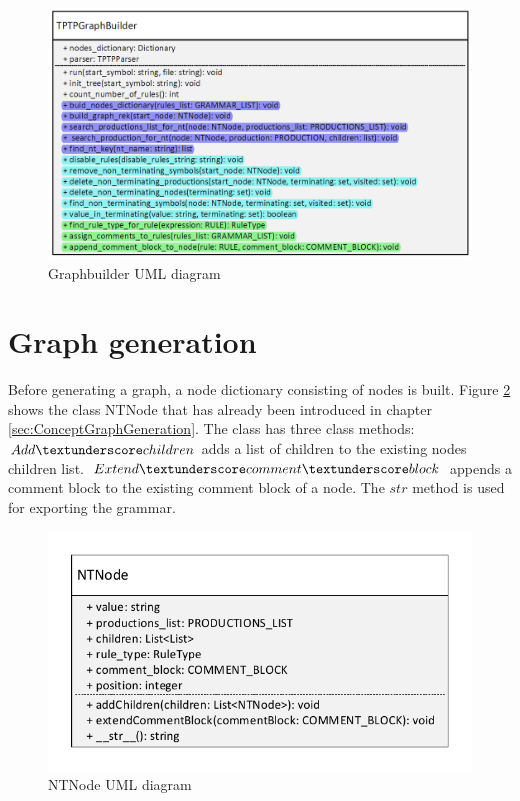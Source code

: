 \begin{figure}[H]
\centering
\includegraphics[width=1 \textwidth]{images/uml_graphbuilder.png}
\caption{Graphbuilder UML diagram}
\label{fig:ImplementationGraphbuilderUML}
\end{figure}                
                
\section{Graph generation}\label{sec:ImplementationGraphGeneration}

Before generating a graph, a node dictionary consisting of nodes is built. Figure \ref{fig:ImplementationNTNodeUML} shows the class NTNode that has already been introduced in chapter \ref{sec:ConceptGraphGeneration}. The class has three class methods:
$Add\textunderscore children$ adds a list of children to the existing nodes children list. $Extend\textunderscore comment\textunderscore block$ appends a comment block to the existing comment block of a node. The $str$ method is used for exporting the grammar.

\begin{figure}[H]
\centering
\includegraphics[width=1\textwidth]{images/uml_data_types_NTNode.pdf}
\caption{NTNode UML diagram}
\label{fig:ImplementationNTNodeUML}
\end{figure}

